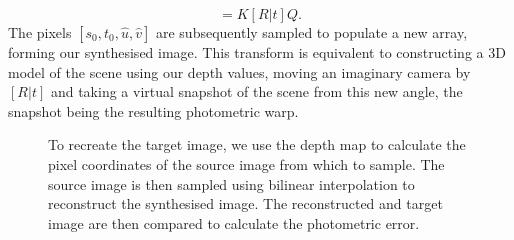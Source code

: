 \begin{equation}
    [s_0, t_0, \hat{u}, \hat{v}] = K[R|t]Q. 
\end{equation}
The pixels $[s_0, t_0, \hat{u}, \hat{v}]$ are subsequently sampled to populate a new array, forming our synthesised image. This transform is equivalent to constructing a 3D model of the scene using our depth values, moving an imaginary camera by $[R|t]$ and taking a virtual snapshot of the scene from this new angle, the snapshot being the resulting photometric warp. \\

\begin{figure}

    \caption[The bilinear interpolation algorithm used for differentiable image-based rendering]{To recreate the target image, we use the depth map to calculate the pixel coordinates of the source image from which to sample. The source image is then sampled using bilinear interpolation to reconstruct the synthesised image. The reconstructed and target image are then compared to calculate the photometric error.}
\end{figure}

